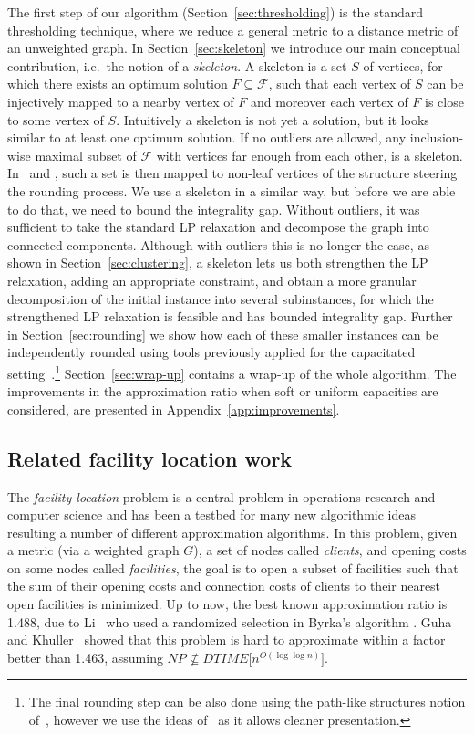 \documentclass{article}
\newcommand{\F}{\mathcal{F}}
\theoremstyle{plain}
\theoremstyle{definition}
\begin{document}
The first step of our algorithm (Section~\ref{sec:thresholding}) is the standard
thresholding technique, where we reduce a general metric to a distance metric of an unweighted graph.
In Section~\ref{sec:skeleton} we introduce our main conceptual
contribution, i.e.\ the notion of a {\em skeleton}.
A skeleton is a set $S$ of vertices, for which
there exists an optimum solution $F \subseteq \F$, 
such that each vertex of $S$ can be injectively mapped to a
nearby vertex of $F$ and moreover each vertex of $F$
is close to some vertex of $S$.
Intuitively a skeleton is not yet a solution, but it looks
similar to at least one optimum solution.
If no outliers are allowed, any inclusion-wise maximal subset of $\F$ with vertices
far enough from each other, is a skeleton.  In~\cite{chk-focs12} and \cite{svensson},
such a set is then mapped to non-leaf vertices of the structure steering the rounding process.
We use a skeleton in a similar way, but before we are able to do that,
we need to bound the integrality gap. Without outliers, it was sufficient to take the
 standard LP relaxation and decompose the graph into connected components. 
Although with outliers this is no longer the case,
as shown in Section~\ref{sec:clustering}, a skeleton lets us both strengthen the LP relaxation, adding an appropriate constraint,
and obtain a more granular decomposition of the initial instance into several
subinstances, for which the strengthened LP relaxation is feasible and has bounded integrality gap.
Further in Section~\ref{sec:rounding} we show how each of these
smaller instances can be independently rounded using tools previously applied for the capacitated setting~\cite{svensson}.\footnote{The final
rounding step can be also done using the path-like structures notion of~\cite{chk-focs12},
however we use the ideas of~\cite{svensson} as it allows cleaner presentation.}
Section~\ref{sec:wrap-up} contains a wrap-up of the whole algorithm.
The improvements in the approximation ratio when soft or uniform capacities are considered, are presented in Appendix~\ref{app:improvements}. 

\subsection{Related facility location work}

The {\em facility location} problem is a central problem in operations
research and computer science and has been a testbed for many new
algorithmic ideas resulting a number of different
approximation algorithms. In this problem,  given a metric (via a weighted graph $G$), a set of nodes called {\em clients},  and opening costs on some nodes called {\em facilities}, the goal is to open a subset of facilities such that the sum of their opening costs and connection costs of clients to their nearest open facilities is minimized. 
Up to now, the best known approximation ratio is 1.488, due to Li~\cite{Li11}
who used a randomized selection in Byrka's algorithm \cite{Byr07}.  Guha and Khuller~\cite{GK} showed that this problem is hard to approximate within a factor better than 1.463, assuming $NP
\not\subseteq DTIME\big[n^{O(\log \log n)}\big]$.
\end{document}
